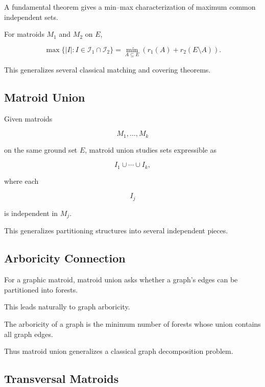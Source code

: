 A fundamental theorem gives a min--max characterization of maximum
common independent sets.

For matroids \(M_1\) and \(M_2\) on \(E\),

\[
\boxed{
\max
\{
|I|:
I\in\mathcal{I}_1\cap\mathcal{I}_2
\}
=
\min_{A\subseteq E}
\left(
r_1(A)+r_2(E\setminus A)
\right).
}
\]

This generalizes several classical matching and covering theorems.

\subsection{Matroid Union}
\label{subsec:matroid-union}

Given matroids

\[
M_1,\ldots,M_k
\]

on the same ground set \(E\), matroid union studies sets expressible as

\[
I_1\cup\cdots\cup I_k,
\]

where each

\[
I_j
\]

is independent in \(M_j\).

This generalizes partitioning structures into several independent
pieces.

\subsection{Arboricity Connection}
\label{subsec:matroid-union-arboricity}

For a graphic matroid, matroid union asks whether a graph's edges can be
partitioned into forests.

This leads naturally to graph arboricity.

The arboricity of a graph is the minimum number of forests whose union
contains all graph edges.

Thus matroid union generalizes a classical graph decomposition problem.

\subsection{Transversal Matroids}
\label{subsec:transversal-matroids}

